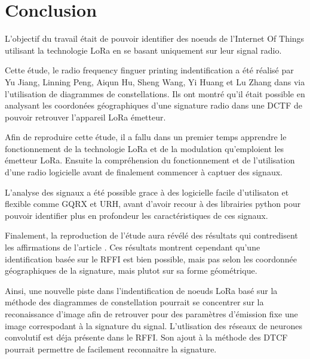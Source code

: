\chapter*{Conclusion}
\renewcommand{\leftmark}{CONCLUSION}

L'objectif du travail était de pouvoir identifier des noeuds de l'Internet Of Things utilisant la technologie LoRa en se basant uniquement sur leur signal radio.

\vspace{0.1cm}

Cette étude, le radio frequency finguer printing indentification a été réalisé par Yu Jiang, Linning Peng, Aiqun Hu, Sheng Wang, Yi Huang et Lu Zhang dans \cite{loraDCTF} via l'utilisation de diagrammes de constellations. Ils ont montré qu'il était possible en analysant les coordonées géographiques d'une signature radio dans une DCTF de pouvoir retrouver l'appareil LoRa émetteur.

\vspace{0.1cm}

Afin de reproduire cette étude, il a fallu dans un premier temps apprendre le fonctionnement de la technologie LoRa et  de la modulation qu'emploient les émetteur LoRa. Ensuite la compréhension du fonctionnement et de l'utilisation d'une radio logicielle avant de finalement commencer à captuer des signaux.

\vspace{0.1cm}

L'analyse des signaux a été possible grace à des logicielle facile d'utilisaton et flexible comme GQRX et URH, avant d'avoir recour à des librairies python pour pouvoir identifier plus en profondeur les caractéristiques de ces signaux.

\vspace{0.1cm}

Finalement, la reproduction de l'étude aura révélé des résultats qui contredisent les affirmations de l'article \cite{loraDCTF}. Ces résultats montrent cependant qu'une identification basée sur le RFFI est bien possible, mais pas selon les coordonnée géographiques de la signature, mais plutot sur sa forme géométrique.

\vspace{0.1cm}

Ainsi, une nouvelle piste dans l'indentification de noeuds LoRa basé sur la méthode des diagrammes de constellation pourrait se concentrer sur la reconaissance d'image afin de retrouver pour des paramètres d'émission fixe une image correspodant à la signature du signal. L'utlisation des réseaux de neurones convolutif est déja présente dans le RFFI. Son ajout à la méthode des DTCF pourrait permettre de facilement reconnaitre la signature.
